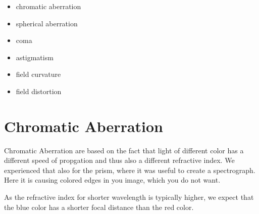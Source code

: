 \documentclass[
  a4paper,
]{book}
\providecommand{\tightlist}{%
  \setlength{\itemsep}{0pt}\setlength{\parskip}{0pt}}
\begin{document}
\begin{itemize}
\tightlist
\item
  chromatic aberration
\item
  spherical aberration
\item
  coma
\item
  astigmatism
\item
  field curvature
\item
  field distortion
\end{itemize}

\section{Chromatic Aberration}\label{chromatic-aberration}

Chromatic Aberration are based on the fact that light of different color
has a different speed of propgation and thus also a different refractive
index. We experienced that also for the prism, where it was useful to
create a spectrograph. Here it is causing colored edges in you image,
which you do not want.

As the refractive index for shorter wavelength is typically higher, we
expect that the blue color has a shorter focal distance than the red
color.
\end{document}
